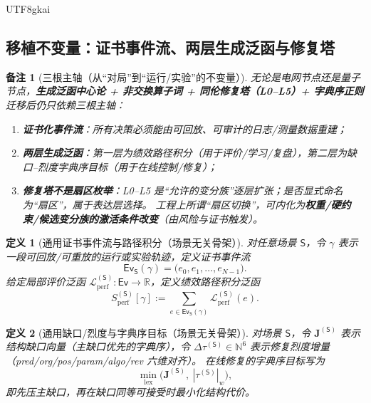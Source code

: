 \documentclass[12pt]{article}
\newtheorem{definition}{定义}[section]
\newtheorem{remark}{备注}[section]
\newcommand{\RR}{\mathbb{R}}
\newcommand{\NN}{\mathbb{N}}
\begin{document}
\begin{CJK*}{UTF8}{gkai}
\subsection{移植不变量：证书事件流、两层生成泛函与修复塔}
\label{sec:migration-invariants-event-functional-tower}

\begin{remark}[三根主轴（从“对局”到“运行/实验”的不变量）]
无论是电网节点还是量子节点，\textbf{生成泛函中心论 + 非交换算子词 + 同伦修复塔（L0--L5）+ 字典序正则}迁移后仍只依赖三根主轴：
\begin{enumerate}
  \item \textbf{证书化事件流}：所有决策必须能由可回放、可审计的日志/测量数据重建；
  \item \textbf{两层生成泛函}：第一层为绩效路径积分（用于评价/学习/复盘），第二层为缺口--烈度字典序目标（用于在线控制/修复）；
  \item \textbf{修复塔不是扇区枚举}：L0--L5 是“允许的变分族”逐层扩张；是否显式命名为“扇区”，属于表达层选择。
  工程上所谓“扇区切换”，可内化为\textbf{权重/硬约束/候选变分族的激活条件改变}（由风险与证书触发）。
\end{enumerate}
\end{remark}

\begin{definition}[通用证书事件流与路径积分（场景无关骨架）]
\label{def:migration-generic-eventstream-functional}
对任意场景 $\mathsf{S}$，令 $\gamma$ 表示一段可回放/可重放的运行或实验轨迹，定义证书事件流
\[
  \mathsf{Ev}_{\mathsf{S}}(\gamma)=\bigl(e_0,e_1,\dots,e_{N-1}\bigr).
\]
给定局部评价泛函 $\mathcal{L}_{\mathrm{perf}}^{(\mathsf{S})}:\mathsf{Ev}\to\RR$，定义绩效路径积分泛函
\[
  S_{\mathrm{perf}}^{(\mathsf{S})}[\gamma]
  :=
  \sum_{e\in \mathsf{Ev}_{\mathsf{S}}(\gamma)} \mathcal{L}_{\mathrm{perf}}^{(\mathsf{S})}(e).
\]
\end{definition}

\begin{definition}[通用缺口/烈度与字典序目标（场景无关骨架）]
\label{def:migration-generic-gap-tau-lex}
对场景 $\mathsf{S}$，令 $\mathbf{J}^{(\mathsf{S})}$ 表示结构缺口向量（主缺口优先的字典序），令 $\Delta\tau^{(\mathsf{S})}\in\NN^6$
  表示修复烈度增量（pred/org/pos/param/algo/rev 六维对齐）。
在线修复的字典序目标写为
\[
  \min_{\mathrm{lex}}\bigl(\mathbf{J}^{(\mathsf{S})},\ |\tau^{(\mathsf{S})}|_w\bigr),
\]
即先压主缺口，再在缺口同等可接受时最小化结构代价。
\end{definition}


\end{CJK*}
\end{document}
